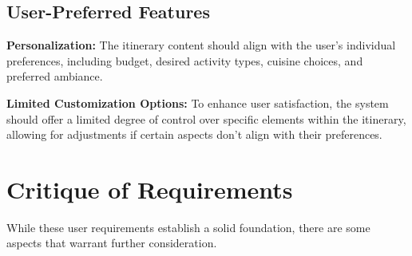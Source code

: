 \documentclass[12pt,a4paper]{report}
\begin{document}
\subsection{User-Preferred Features}

\begin{description}
\item{\textbf{Personalization:} The itinerary content should align with the user's individual preferences, including budget, desired activity types, cuisine choices, and preferred ambiance.}
\item{\textbf{Limited Customization Options:} To enhance user satisfaction, the system should offer a limited degree of control over specific elements within the itinerary, allowing for adjustments if certain aspects don't align with their preferences.}
\end{description}

\section{Critique of Requirements}

While these user requirements establish a solid foundation, there are some aspects that warrant further consideration.
\end{document}

